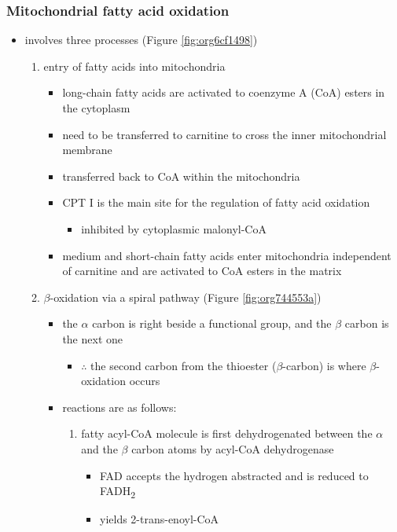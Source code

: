 \documentclass[12pt]{scrartcl}
\begin{document}
\subsubsection{Mitochondrial fatty acid oxidation}
\label{sec:org5517c3a}
\begin{itemize}
\item involves three processes (Figure \ref{fig:org6cf1498})
\begin{enumerate}
\item entry of fatty acids into mitochondria
\begin{itemize}
\item long-chain fatty acids are activated to coenzyme A (CoA) esters
in the cytoplasm
\item need to be transferred to carnitine to cross the inner
mitochondrial membrane
\item transferred back to CoA within the mitochondria
\item CPT I is the main site for the regulation of fatty acid
oxidation
\begin{itemize}
\item inhibited by cytoplasmic malonyl-CoA
\end{itemize}
\item medium and short-chain fatty acids enter mitochondria
independent of carnitine and are activated to CoA esters in the
matrix
\end{itemize}
\item \(\beta\)-oxidation via a spiral pathway (Figure \ref{fig:org744553a})
\begin{itemize}
\item the \(\alpha\) carbon is right beside a functional group, and the
\(\beta\) carbon is the next one
\begin{itemize}
\item \(\therefore\) the second carbon from the thioester (\(\beta\)-carbon) is where
\(\beta\)-oxidation occurs
\end{itemize}
\item reactions are as follows:
\begin{enumerate}
\item fatty acyl-CoA molecule is first dehydrogenated between the \(\alpha\)
and the \(\beta\) carbon atoms by acyl-CoA dehydrogenase
\begin{itemize}
\item FAD accepts the hydrogen abstracted and is reduced to FADH\textsubscript{2}
\item yields 2-trans-enoyl-CoA
\end{itemize}

\end{enumerate}
\end{itemize}
\end{enumerate}
\end{itemize}
\end{document}
